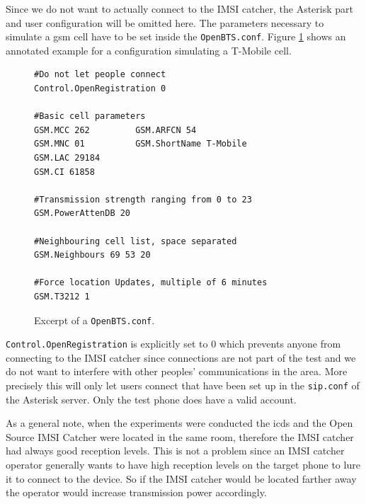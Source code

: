 Since we do not want to actually connect to the IMSI catcher, the Asterisk part and user configuration will be omitted here.
The parameters necessary to simulate a \gls{gsm} cell have to be set inside the \texttt{OpenBTS.conf}.
Figure \ref{fig:openbts_parameters} shows an annotated example for a configuration simulating a T-Mobile cell.
\begin{figure}
\hspace*{\dimexpr\fboxsep+\fboxrule}%
\begin{minipage}{\dimexpr\textwidth-4\fboxsep-2\fboxrule} 
\begin{lstlisting}
#Do not let people connect
Control.OpenRegistration 0

#Basic cell parameters
GSM.MCC 262			GSM.ARFCN 54
GSM.MNC 01			GSM.ShortName T-Mobile
GSM.LAC 29184		
GSM.CI 61858
	
#Transmission strength ranging from 0 to 23
GSM.PowerAttenDB 20

#Neighbouring cell list, space separated
GSM.Neighbours 69 53 20

#Force location Updates, multiple of 6 minutes
GSM.T3212 1
\end{lstlisting}
\end{minipage}
\caption{Excerpt of a \texttt{OpenBTS.conf}.}
\label{fig:openbts_parameters}
\end{figure}
\texttt{Control.OpenRegistration} is explicitly set to 0 which prevents anyone from connecting to the IMSI catcher since connections are not part of the test and we do not want to interfere with other peoples' communications in the area.
More precisely this will only let users connect that have been set up in the \texttt{sip.conf} of the Asterisk server.
Only the test phone does have a valid account.

As a general note, when the experiments were conducted the \gls{icds} and the Open Source IMSI Catcher were located in the same room, therefore the IMSI catcher had always good reception levels.
This is not a problem since an IMSI catcher operator generally wants to have high reception levels on the target phone to lure it to connect to the device.
So if the IMSI catcher would be located farther away the operator would increase transmission power accordingly.

